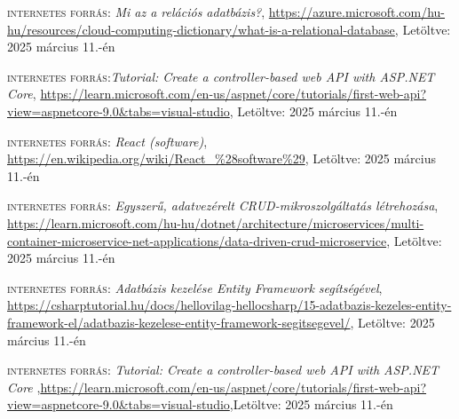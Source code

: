 \documentclass[colorlinks]{thesis-kando}
\theoremstyle{definition}
\theoremstyle{remark}
\begin{document}
\begin{thebibliography}{2}
 \textsc{internetes forrás}: \emph{Mi az a relációs adatbázis?}, \url{https://azure.microsoft.com/hu-hu/resources/cloud-computing-dictionary/what-is-a-relational-database},  Letöltve: 2025 március 11.-én

 \textsc{internetes forrás}:\emph{Tutorial: Create a controller-based web API with ASP.NET Core}, \url{https://learn.microsoft.com/en-us/aspnet/core/tutorials/first-web-api?view=aspnetcore-9.0&tabs=visual-studio},  Letöltve: 2025 március 11.-én

 \textsc{internetes forrás}: \emph{React (software)}, \url{https://en.wikipedia.org/wiki/React_%28software%29},  Letöltve: 2025 március 11.-én

 \textsc{internetes forrás}: \emph{Egyszerű, adatvezérelt CRUD-mikroszolgáltatás létrehozása}, \url{https://learn.microsoft.com/hu-hu/dotnet/architecture/microservices/multi-container-microservice-net-applications/data-driven-crud-microservice},  Letöltve: 2025 március 11.-én

 \textsc{internetes forrás}: \emph{Adatbázis kezelése Entity Framework segítségével}, \url{https://csharptutorial.hu/docs/hellovilag-hellocsharp/15-adatbazis-kezeles-entity-framework-el/adatbazis-kezelese-entity-framework-segitsegevel/},  Letöltve: 2025 március 11.-én

 \textsc{internetes forrás}: \emph{Tutorial: Create a controller-based web API with ASP.NET Core
},\url{https://learn.microsoft.com/en-us/aspnet/core/tutorials/first-web-api?view=aspnetcore-9.0&tabs=visual-studio},Letöltve: 2025 március 11.-én

\end{thebibliography}
\end{document}
